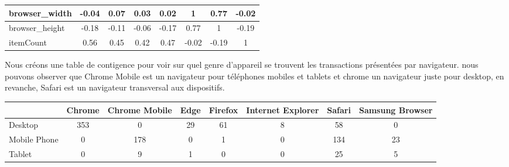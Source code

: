 \begin{table}[ht]
\begin{adjustbox}{width=1\textwidth}
\begin{tabular}{|l|c|c|c|c|c|c|c|}
browser\_width          & -0.04                     & 0.07                           & 0.03                                         & 0.02                            & 1                                   & \cellcolor{green!15}0.77                                 & -0.02                          \\ \hline
browser\_height         & -0.18                     & -0.11                          & -0.06                                        & -0.17                           &\cellcolor{green!15} 0.77                                & 1                                    & -0.19                          \\ \hline
itemCount               & 0.56                      & 0.45                           & 0.42                                         & 0.47                            & -0.02                               & -0.19                                & 1                              \\ \hline
\end{tabular}
\end{adjustbox}
\end{table}
 
Nous créons une table de contigence pour voir sur quel genre d'appareil se trouvent les transactions présentées par navigateur. nous pouvons observer que Chrome Mobile est un navigateur pour téléphones mobiles et tablets et chrome un navigateur juste pour desktop, en revanche,  Safari est un navigateur transversal aux dispositifs.
\begin{table}[ht]
\begin{adjustbox}{width=1\textwidth}
\small
\begin{tabular}{|l|c|c|c|c|c|c|c|}
\hline
             & \multicolumn{1}{l|}{Chrome} & \multicolumn{1}{l|}{Chrome Mobile} & \multicolumn{1}{l|}{Edge} & \multicolumn{1}{l|}{Firefox} & \multicolumn{1}{l|}{Internet Explorer} & \multicolumn{1}{l|}{Safari} & \multicolumn{1}{l|}{Samsung Browser} \\ \hline
Desktop      & 353                         & 0                                  & 29                        & 61                           & 8                                      & 58                          & 0                                    \\ \hline
Mobile Phone & 0                           & 178                                & 0                         & 1                            & 0                                      & 134                         & 23                                   \\ \hline
Tablet       & 0                           & 9                                  & 1                         & 0                            & 0                                      & 25                          & 5                                    \\ \hline
\end{tabular}
\end{adjustbox}
\end{table}


